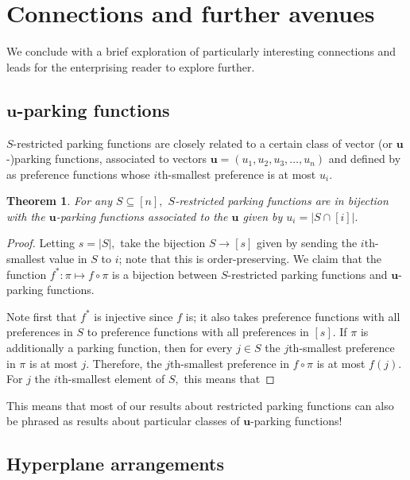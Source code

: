 \documentclass[12 pt]{amsart}
\newtheorem{theorem}{Theorem}[section]
\theoremstyle{definition} %
\theoremstyle{remark} %
\begin{document}
\section{Connections and further avenues}

We conclude with a brief exploration of particularly interesting connections and leads for the enterprising reader to explore further.

\subsection{$\mathbf{u}$-parking functions}

$S$-restricted parking functions are closely related to a certain class of vector (or $\mathbf{u}$-)parking functions, associated to vectors $\mathbf{u}=(u_1,u_2,u_3,\ldots,u_n)$ and defined by \cite{} as preference functions whose $i$th-smallest preference is at most $u_i.$

\begin{theorem}
    For any $S\subseteq[n],$ $S$-restricted parking functions are in bijection with the $\mathbf{u}$-parking functions associated to the $\mathbf{u}$ given by $u_i=|S\cap [i]|.$
\end{theorem}
\begin{proof}
    Letting $s=|S|,$ take the bijection $S\to [s]$ given by sending the $i$th-smallest value in $S$ to $i$; note that this is order-preserving. We claim that the function $f^*: \pi\mapsto f\circ \pi$ is a bijection between $S$-restricted parking functions and $\mathbf{u}$-parking functions.

    Note first that $f^*$ is injective since $f$ is; it also takes preference functions with all preferences in $S$ to preference functions with all preferences in $[s].$ If $\pi$ is additionally a parking function, then for every $j\in S$ the $j$th-smallest preference in $\pi$ is at most $j.$ Therefore, the $j$th-smallest preference in $f\circ\pi$ is at most $f(j).$ For $j$ the $i$th-smallest element of $S,$ this means that 
\end{proof}

This means that most of our results about restricted parking functions can also be phrased as results about particular classes of $\mathbf{u}$-parking functions!

\subsection{Hyperplane arrangements}
\end{document}
